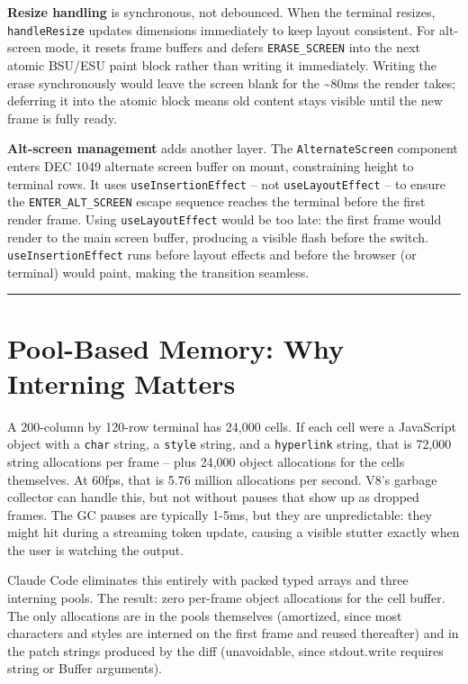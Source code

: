 \documentclass[
  english,
  11pt,
  letterpaper,
]{book}
\begin{document}
\textbf{Resize handling} is synchronous, not debounced. When the
terminal resizes, \texttt{handleResize} updates dimensions immediately
to keep layout consistent. For alt-screen mode, it resets frame buffers
and defers \texttt{ERASE\_SCREEN} into the next atomic BSU/ESU paint
block rather than writing it immediately. Writing the erase
synchronously would leave the screen blank for the \textasciitilde80ms
the render takes; deferring it into the atomic block means old content
stays visible until the new frame is fully ready.

\textbf{Alt-screen management} adds another layer. The
\texttt{AlternateScreen} component enters DEC 1049 alternate screen
buffer on mount, constraining height to terminal rows. It uses
\texttt{useInsertionEffect} -- not \texttt{useLayoutEffect} -- to ensure
the \texttt{ENTER\_ALT\_SCREEN} escape sequence reaches the terminal
before the first render frame. Using \texttt{useLayoutEffect} would be
too late: the first frame would render to the main screen buffer,
producing a visible flash before the switch. \texttt{useInsertionEffect}
runs before layout effects and before the browser (or terminal) would
paint, making the transition seamless.

\begin{center}\rule{0.5\linewidth}{0.5pt}\end{center}

\section{Pool-Based Memory: Why Interning
Matters}\label{pool-based-memory-why-interning-matters}

A 200-column by 120-row terminal has 24,000 cells. If each cell were a
JavaScript object with a \texttt{char} string, a \texttt{style} string,
and a \texttt{hyperlink} string, that is 72,000 string allocations per
frame -- plus 24,000 object allocations for the cells themselves. At
60fps, that is 5.76 million allocations per second. V8's garbage
collector can handle this, but not without pauses that show up as
dropped frames. The GC pauses are typically 1-5ms, but they are
unpredictable: they might hit during a streaming token update, causing a
visible stutter exactly when the user is watching the output.

Claude Code eliminates this entirely with packed typed arrays and three
interning pools. The result: zero per-frame object allocations for the
cell buffer. The only allocations are in the pools themselves
(amortized, since most characters and styles are interned on the first
frame and reused thereafter) and in the patch strings produced by the
diff (unavoidable, since stdout.write requires string or Buffer
arguments).
\end{document}
